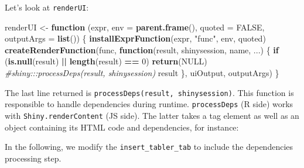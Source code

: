 \documentclass[
]{book}
\newenvironment{Shaded}{\begin{snugshade}}{\end{snugshade}}
\newcommand{\AttributeTok}[1]{\textcolor[rgb]{0.77,0.63,0.00}{#1}}
\newcommand{\CommentTok}[1]{\textcolor[rgb]{0.56,0.35,0.01}{\textit{#1}}}
\newcommand{\ControlFlowTok}[1]{\textcolor[rgb]{0.13,0.29,0.53}{\textbf{#1}}}
\newcommand{\DataTypeTok}[1]{\textcolor[rgb]{0.13,0.29,0.53}{#1}}
\newcommand{\DecValTok}[1]{\textcolor[rgb]{0.00,0.00,0.81}{#1}}
\newcommand{\KeywordTok}[1]{\textcolor[rgb]{0.13,0.29,0.53}{\textbf{#1}}}
\newcommand{\NormalTok}[1]{#1}
\newcommand{\OperatorTok}[1]{\textcolor[rgb]{0.81,0.36,0.00}{\textbf{#1}}}
\newcommand{\OtherTok}[1]{\textcolor[rgb]{0.56,0.35,0.01}{#1}}
\newcommand{\StringTok}[1]{\textcolor[rgb]{0.31,0.60,0.02}{#1}}
\newcommand{\VariableTok}[1]{\textcolor[rgb]{0.00,0.00,0.00}{#1}}
\begin{document}
Let's look at \texttt{renderUI}:

\begin{Shaded}
\begin{Highlighting}[]
\NormalTok{renderUI <-}\StringTok{ }\ControlFlowTok{function}\NormalTok{ (expr, }\DataTypeTok{env =} \KeywordTok{parent.frame}\NormalTok{(), }\DataTypeTok{quoted =} \OtherTok{FALSE}\NormalTok{, }\DataTypeTok{outputArgs =} \KeywordTok{list}\NormalTok{()) \{}
    \KeywordTok{installExprFunction}\NormalTok{(expr, }\StringTok{"func"}\NormalTok{, env, quoted)}
    \KeywordTok{createRenderFunction}\NormalTok{(func, }\ControlFlowTok{function}\NormalTok{(result, shinysession, }
\NormalTok{        name, ...) \{}
        \ControlFlowTok{if}\NormalTok{ (}\KeywordTok{is.null}\NormalTok{(result) }\OperatorTok{||}\StringTok{ }\KeywordTok{length}\NormalTok{(result) }\OperatorTok{==}\StringTok{ }\DecValTok{0}\NormalTok{) }
            \KeywordTok{return}\NormalTok{(}\OtherTok{NULL}\NormalTok{)}
        \CommentTok{#shiny:::processDeps(result, shinysession)}
\NormalTok{      result}
\NormalTok{    \}, uiOutput, outputArgs)}
\NormalTok{\}}
\end{Highlighting}
\end{Shaded}

The last line returned is \texttt{processDeps(result,\ shinysession)}. This function is responsible to handle dependencies during runtime. \texttt{processDeps} (R side) works with \texttt{Shiny.renderContent} (JS side). The latter takes a tag element as well as an object containing its HTML code and dependencies, for instance:

\begin{Shaded}
\end{Shaded}

In the following, we modify the \texttt{insert\_tabler\_tab} to include the dependencies processing step.
\end{document}
